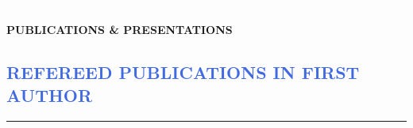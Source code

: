 \documentclass[12pt]{article}
\begin{document}
\newpage

\textcolor{White}{.}
\vspace{-1.cm}
\begin{center}
\begin{Large}
\textbf{PUBLICATIONS \& PRESENTATIONS}\\
\end{Large}
\setcounter{section}{0}
\end{center}
\vspace{-0.8cm}
\textcolor{RoyalBlue}{\section{\large REFEREED PUBLICATIONS  IN FIRST AUTHOR}
\vspace{-0.35cm}\hrule}
\vspace{0.6cm}
\end{document}
